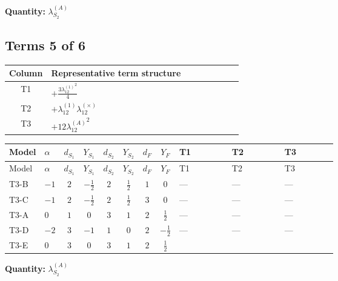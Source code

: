 \documentclass[8pt]{article}
\begin{document}
\begin{landscape}
\begin{longtable}{@{}llcccccc >{\raggedright\arraybackslash}p{0.21\linewidth} >{\raggedright\arraybackslash}p{0.21\linewidth} >{\raggedright\arraybackslash}p{0.21\linewidth}@{}}
\midrule
\bottomrule
\end{longtable}
\clearpage
\noindent\textbf{Quantity: }$\lambda_{S_2}^{(A)}$\par\smallskip
\subsection*{Terms 5 of 6}
\begin{center}
\begin{tabular}{@{}c >{\raggedright\arraybackslash}p{0.82\linewidth}@{}}
\toprule
Column & Representative term structure \\
\midrule
T1 & \(\displaystyle +\frac{3 {\lambda_{12}^{(1)}}^2}{4}\) \\
\midrule
T2 & \(\displaystyle +{\lambda_{12}^{(1)}} {\lambda_{12}^{(\times)}}\) \\
\midrule
T3 & \(\displaystyle +12 {\lambda_{12}^{(A)}}^2\) \\
\midrule
\bottomrule
\end{tabular}
\end{center}
\smallskip
\tiny
\begin{longtable}{@{}llcccccc >{\raggedright\arraybackslash}p{0.21\linewidth} >{\raggedright\arraybackslash}p{0.21\linewidth} >{\raggedright\arraybackslash}p{0.21\linewidth}@{}}
\toprule
Model & $\alpha$ & $d_{S_1}$ & $Y_{S_1}$ & $d_{S_2}$ & $Y_{S_2}$ & $d_F$ & $Y_F$ & T1 & T2 & T3 \\
\midrule
\endfirsthead
\toprule
Model & $\alpha$ & $d_{S_1}$ & $Y_{S_1}$ & $d_{S_2}$ & $Y_{S_2}$ & $d_F$ & $Y_F$ & T1 & T2 & T3 \\
\midrule
\endhead
T3-B & $-1$ & $2$ & $-\frac{1}{2}$ & $2$ & $\frac{1}{2}$ & $1$ & $0$ & --- & --- & --- \\
\midrule
T3-C & $-1$ & $2$ & $-\frac{1}{2}$ & $2$ & $\frac{1}{2}$ & $3$ & $0$ & --- & --- & --- \\
\midrule
T3-A & $0$ & $1$ & $0$ & $3$ & $1$ & $2$ & $\frac{1}{2}$ & --- & --- & --- \\
\midrule
T3-D & $-2$ & $3$ & $-1$ & $1$ & $0$ & $2$ & $-\frac{1}{2}$ & --- & --- & --- \\
\midrule
T3-E & $0$ & $3$ & $0$ & $3$ & $1$ & $2$ & $\frac{1}{2}$ & \scriptsize\adjustbox{max width=\linewidth}{$\begin{gathered} +\frac{3 {\lambda_{12}^{(1)}}^2}{4}\end{gathered}$} & \scriptsize\adjustbox{max width=\linewidth}{$\begin{gathered} +{\lambda_{12}^{(1)}} {\lambda_{12}^{(\times)}}\end{gathered}$} & \scriptsize\adjustbox{max width=\linewidth}{$\begin{gathered} +12 {\lambda_{12}^{(A)}}^2\end{gathered}$} \\
\midrule
\bottomrule
\end{longtable}
\clearpage
\noindent\textbf{Quantity: }$\lambda_{S_2}^{(A)}$\par\smallskip

\end{landscape}
\end{document}
